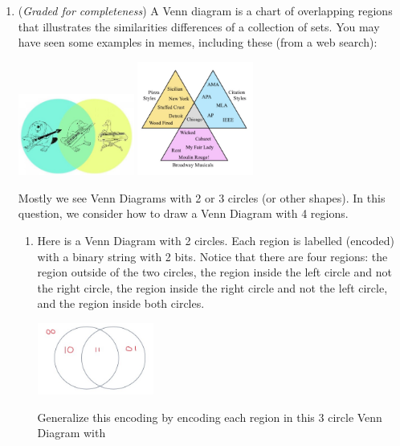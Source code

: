 \documentclass[12pt, oneside]{article}
\newcommand{\gradeComplete}{({\it Graded for completeness}) }
\begin{document}
\begin{enumerate}[labelindent=0pt, leftmargin=0pt]
\begin{enumerate}
    \item \gradeComplete A Venn diagram is a chart of overlapping regions that illustrates the similarities
    differences of a collection of sets. You may have seen some examples in memes, including
    these (from a web search):
    \begin{center}
        \hfill\includegraphics[width=1.5in]{../../resources/images/funny-pictures-venn-diagram-duck-5448120.jpeg} \hfill
        \includegraphics[width=1.5in]{../../resources/images/detroit-ap-chicago-ieee-wood-fired-wicked-cabaret-my-fair-lady-rent-moulin-rouge-broadway-musicals.png}
        \hfill
    \end{center}
    Mostly we see Venn Diagrams with 2 or 3 circles (or other shapes). In this question, 
    we consider how to draw a Venn Diagram with 4 regions.
    \begin{enumerate}
        \item Here is a Venn Diagram with 2 circles. Each region is labelled (encoded) with a 
        binary string with 2 bits. Notice that there are four regions: the region outside
        of the two circles, the region inside the left circle and not the right circle, the region 
        inside the right circle and not the left circle, and the region inside both circles.
        \begin{center}
            \includegraphics[width=1.5in]{../../resources/images/VennDiagram2Circles.png}
        \end{center}
        Generalize this encoding by encoding each region in this 3 circle Venn Diagram with 

\end{enumerate}
\end{enumerate}
\end{enumerate}
\end{document}
